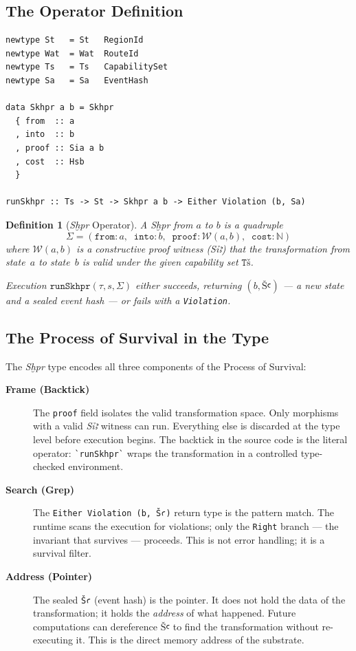 \documentclass[11pt,letterpaper]{article}
\newtheorem{definition}[theorem]{Definition}
\begin{document}
\subsection{The Operator Definition}

\begin{lstlisting}
newtype St   = St   RegionId
newtype Wat  = Wat  RouteId
newtype Ts   = Ts   CapabilitySet
newtype Sa   = Sa   EventHash

data Skhpr a b = Skhpr
  { from  :: a
  , into  :: b
  , proof :: Sia a b
  , cost  :: Hsb
  }

runSkhpr :: Ts -> St -> Skhpr a b -> Either Violation (b, Sa)
\end{lstlisting}

\begin{definition}[\textit{Sḫpr} Operator]
\label{def:skhpr}
A \textit{Sḫpr} from $a$ to $b$ is a quadruple
\[
\Sigma = (\mathtt{from}: a,\;\; \mathtt{into}: b,\;\; \mathtt{proof}: \mathcal{W}(a,b),\;\; \mathtt{cost}: \mathbb{N})
\]
where $\mathcal{W}(a,b)$ is a constructive proof witness (\textit{Sỉꜣ}) that the
transformation from state~$a$ to state~$b$ is valid under the given capability
set $\mathtt{Tš}$.

Execution $\mathtt{runSkhpr}(\tau, s, \Sigma)$ either succeeds, returning
$(b, \mathtt{Šꜥ})$ --- a new state and a sealed event hash --- or fails with
a \texttt{Violation}.
\end{definition}

\subsection{The Process of Survival in the Type}

The \textit{Sḫpr} type encodes all three components of the Process of Survival:

\begin{description}
\item[\textbf{Frame (Backtick)}]
  The \texttt{proof} field isolates the valid transformation space.  Only
  morphisms with a valid \textit{Sỉꜣ} witness can run.  Everything else is
  discarded at the type level before execution begins.  The backtick in the
  source code is the literal operator: \verb|`runSkhpr`| wraps the
  transformation in a controlled type-checked environment.

\item[\textbf{Search (Grep)}]
  The \texttt{Either Violation (b, Šꜥ)} return type is the pattern match.
  The runtime scans the execution for violations; only the \texttt{Right}
  branch --- the invariant that survives --- proceeds.  This is not error
  handling; it is a survival filter.

\item[\textbf{Address (Pointer)}]
  The sealed \texttt{Šꜥ} (event hash) is the pointer.  It does not hold
  the data of the transformation; it holds the \emph{address} of what
  happened.  Future computations can dereference $\mathtt{Šꜥ}$ to find
  the transformation without re-executing it.  This is the direct memory
  address of the substrate.
\end{description}
\end{document}
